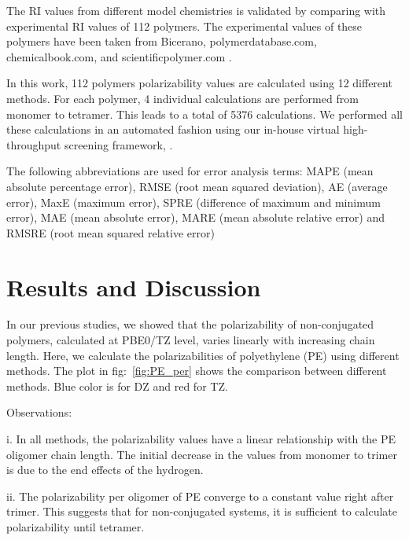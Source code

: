 The RI values from different model chemistries is validated by comparing with experimental RI values of 112 polymers. The experimental values of these polymers have been taken from Bicerano, polymerdatabase.com, chemicalbook.com, and scientificpolymer.com \cite{Bicerano2002}. 

In this work, 112 polymers polarizability values are calculated using 12 different methods. For each polymer, 4 individual calculations are performed from monomer to tetramer. This leads to a total of 5376 calculations. We performed all these calculations in an automated fashion using our in-house virtual high-throughput screening framework, \chemhtps. 

The following abbreviations are used for error analysis terms:
MAPE (mean absolute percentage error),
RMSE (root mean squared deviation),
AE (average error),
MaxE (maximum error),
SPRE (difference of maximum and minimum error),
MAE (mean absolute error),
MARE (mean absolute relative error) and
RMSRE (root mean squared relative error)


\section{Results and Discussion}
\label{sec:results_discussion3}

In our previous studies, we showed that the polarizability of non-conjugated polymers, calculated at PBE0/TZ level, varies linearly with increasing chain length. Here, we calculate the polarizabilities of polyethylene (PE) using different methods. The plot in fig:\ \ref{fig:PE_per} shows the comparison between different methods. Blue color is for DZ and red for TZ. 

Observations:

i. In all methods, the polarizability values have a linear relationship with the PE oligomer chain length. The initial decrease in the values from monomer to trimer is due to the end effects of the hydrogen.

ii. The polarizability per oligomer of PE converge to a constant value right after trimer. This suggests that for non-conjugated systems, it is sufficient to calculate polarizability until tetramer. 

